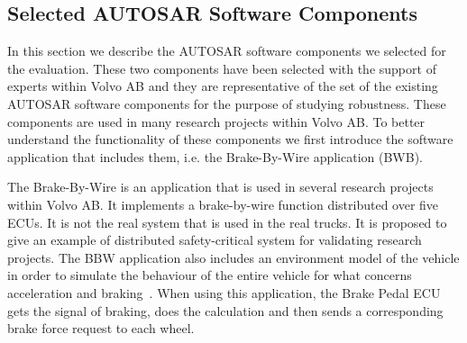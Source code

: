 \subsection{Selected AUTOSAR Software Components}\label{sec:example}
In this section we describe the AUTOSAR software components we selected for the evaluation. These two components have been selected with the support of experts within Volvo AB and they are representative of the set of the existing AUTOSAR software components for the purpose of studying robustness. These components are used in many research projects within Volvo AB. 
%
To better understand the functionality of these components %
we first introduce the software application that includes them, i.e. the Brake-By-Wire application (BWB). %

The Brake-By-Wire is an application that is used in several research projects within Volvo AB. %
It implements a brake-by-wire function distributed over five ECUs. It is not the real system that is used in the real trucks. It is proposed to give an example of distributed safety-critical system for validating research projects. The BBW application also includes an environment model of the vehicle in order to simulate the behaviour of the entire vehicle for what concerns acceleration and braking~\cite{pp}. When using this application, the Brake Pedal ECU gets the signal of braking, does the calculation and then sends a corresponding brake force request to each wheel.

